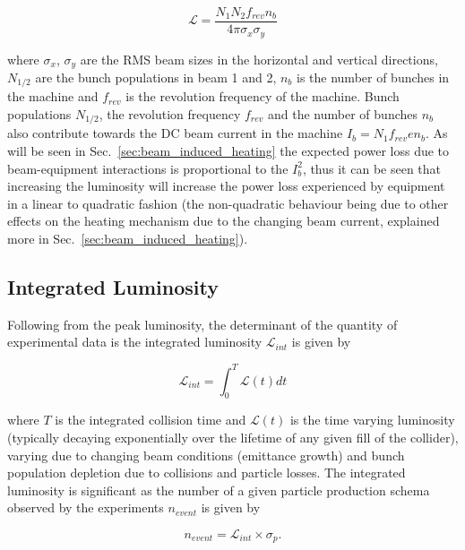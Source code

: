 \begin{equation}
\mathcal{L} = \frac{N_{1} N_{2} f_{rev} n_{b}}{4 \pi \sigma_{x} \sigma_{y}}
\label{eqn:LumiBeamPara}
\end{equation}

where $\sigma_{x}$, $\sigma_{y}$ are the RMS beam sizes in the horizontal and vertical directions, $N_{1/2}$ are the bunch populations in beam 1 and 2, $n_{b}$ is the number of bunches in the machine and $f_{rev}$ is the revolution frequency of the machine. Bunch populations $N_{1/2}$, the revolution frequency $f_{rev}$ and the number of bunches $n_{b}$ also contribute towards the DC beam current in the machine $I_{b} = N_{1} f_{rev} e n_{b}$. As will be seen in Sec.~\ref{sec:beam_induced_heating} the expected power loss due to beam-equipment interactions is proportional to the $I_{b}^{2}$, thus it can be seen that increasing the luminosity will increase the power loss experienced by equipment in a linear to quadratic fashion (the non-quadratic behaviour being due to other effects on the heating mechanism due to the changing beam current, explained more in Sec.~\ref{sec:beam_induced_heating}).

\subsection{Integrated Luminosity}

Following from the peak luminosity, the determinant of the quantity of experimental data is the integrated luminosity $\mathcal{L}_{int}$ is given by

\begin{equation}
\mathcal{L}_{int} = \int^{T}_{0} \mathcal{L} \left( t \right) dt
\end{equation}

where $T$ is the integrated collision time and $\mathcal{L} (t)$ is the time varying luminosity (typically decaying exponentially over the lifetime of any given fill of the collider\cite{McCrory:lumiEvo}), varying due to changing beam conditions (emittance growth) and bunch population depletion due to collisions and particle losses. The integrated luminosity is significant as the number of a given particle production schema observed by the experiments $n_{event}$ is given by

\begin{equation}
n_{event} = \mathcal{L}_{int} \times \sigma_{p}.
\end{equation}

